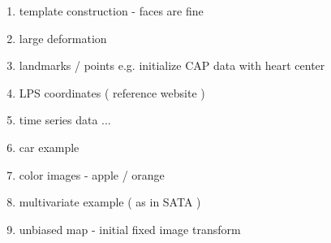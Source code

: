 \documentclass{frontiersSCNS}
\begin{document}
\begin{enumerate}

  \item template construction - faces are fine 

  \item large deformation 

  \item landmarks / points e.g. initialize CAP data with heart center 

  \item LPS coordinates ( reference website ) 

  \item time series data ... 

  \item car example 

  \item color images - apple / orange 

  \item multivariate example ( as in SATA ) 

   \item unbiased map - initial fixed image transform 

\end{enumerate}
\end{document}
